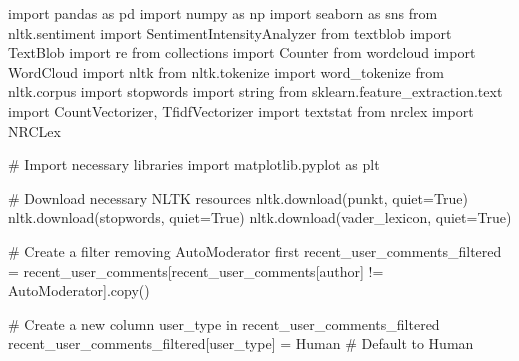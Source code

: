 \documentclass[
  12pt,
  letterpaper,
  DIV=11,
  numbers=noendperiod]{scrartcl}
\newenvironment{Shaded}{\begin{snugshade}}{\end{snugshade}}
\newcommand{\CommentTok}[1]{\textcolor[rgb]{0.37,0.37,0.37}{#1}}
\newcommand{\ImportTok}[1]{\textcolor[rgb]{0.00,0.46,0.62}{#1}}
\newcommand{\NormalTok}[1]{\textcolor[rgb]{0.00,0.23,0.31}{#1}}
\newcommand{\OperatorTok}[1]{\textcolor[rgb]{0.37,0.37,0.37}{#1}}
\newcommand{\StringTok}[1]{\textcolor[rgb]{0.13,0.47,0.30}{#1}}
\newcommand{\VariableTok}[1]{\textcolor[rgb]{0.07,0.07,0.07}{#1}}
\begin{document}
\begin{Shaded}
\begin{Highlighting}[]
\ImportTok{import}\NormalTok{ pandas }\ImportTok{as}\NormalTok{ pd}
\ImportTok{import}\NormalTok{ numpy }\ImportTok{as}\NormalTok{ np}
\ImportTok{import}\NormalTok{ seaborn }\ImportTok{as}\NormalTok{ sns}
\ImportTok{from}\NormalTok{ nltk.sentiment }\ImportTok{import}\NormalTok{ SentimentIntensityAnalyzer}
\ImportTok{from}\NormalTok{ textblob }\ImportTok{import}\NormalTok{ TextBlob}
\ImportTok{import}\NormalTok{ re}
\ImportTok{from}\NormalTok{ collections }\ImportTok{import}\NormalTok{ Counter}
\ImportTok{from}\NormalTok{ wordcloud }\ImportTok{import}\NormalTok{ WordCloud}
\ImportTok{import}\NormalTok{ nltk}
\ImportTok{from}\NormalTok{ nltk.tokenize }\ImportTok{import}\NormalTok{ word\_tokenize}
\ImportTok{from}\NormalTok{ nltk.corpus }\ImportTok{import}\NormalTok{ stopwords}
\ImportTok{import}\NormalTok{ string}
\ImportTok{from}\NormalTok{ sklearn.feature\_extraction.text }\ImportTok{import}\NormalTok{ CountVectorizer, TfidfVectorizer}
\ImportTok{import}\NormalTok{ textstat}
\ImportTok{from}\NormalTok{ nrclex }\ImportTok{import}\NormalTok{ NRCLex}

\CommentTok{\# Import necessary libraries}
\ImportTok{import}\NormalTok{ matplotlib.pyplot }\ImportTok{as}\NormalTok{ plt}

\CommentTok{\# Download necessary NLTK resources}
\NormalTok{nltk.download(}\StringTok{\textquotesingle{}punkt\textquotesingle{}}\NormalTok{, quiet}\OperatorTok{=}\VariableTok{True}\NormalTok{)}
\NormalTok{nltk.download(}\StringTok{\textquotesingle{}stopwords\textquotesingle{}}\NormalTok{, quiet}\OperatorTok{=}\VariableTok{True}\NormalTok{)}
\NormalTok{nltk.download(}\StringTok{\textquotesingle{}vader\_lexicon\textquotesingle{}}\NormalTok{, quiet}\OperatorTok{=}\VariableTok{True}\NormalTok{)}

\CommentTok{\# Create a filter removing AutoModerator first}
\NormalTok{recent\_user\_comments\_filtered }\OperatorTok{=}\NormalTok{ recent\_user\_comments[recent\_user\_comments[}\StringTok{\textquotesingle{}author\textquotesingle{}}\NormalTok{] }\OperatorTok{!=} \StringTok{\textquotesingle{}AutoModerator\textquotesingle{}}\NormalTok{].copy()}

\CommentTok{\# Create a new column \textquotesingle{}user\_type\textquotesingle{} in recent\_user\_comments\_filtered}
\NormalTok{recent\_user\_comments\_filtered[}\StringTok{\textquotesingle{}user\_type\textquotesingle{}}\NormalTok{] }\OperatorTok{=} \StringTok{\textquotesingle{}Human\textquotesingle{}}  \CommentTok{\# Default to Human}


\end{Highlighting}
\end{Shaded}
\end{document}
